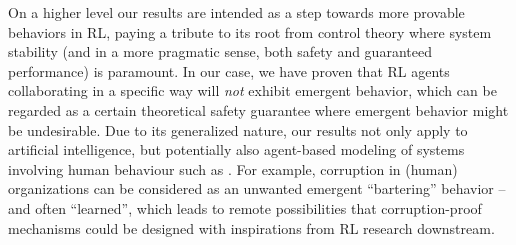 \documentclass{article}
\begin{document}
On a higher level our results are intended as a step towards more provable behaviors in RL,
paying a tribute to its root from control theory where system stability (and in a more pragmatic sense,
both safety and guaranteed performance)
is paramount.
In our case, we have proven that RL agents collaborating
in a specific way will \emph{not} exhibit emergent behavior, which
can be regarded as a certain theoretical safety guarantee where emergent behavior might be undesirable.
Due to its generalized nature, our results not only apply to artificial intelligence,
but potentially also agent-based modeling of
systems involving human behaviour such as \cite{Bouarfa2013AgentbasedMA}.
For example, corruption in (human) organizations can be considered
as an unwanted emergent ``bartering'' behavior -- and often ``learned'', which leads to remote possibilities that corruption-proof mechanisms could be designed with inspirations from RL research downstream.
\end{document}
